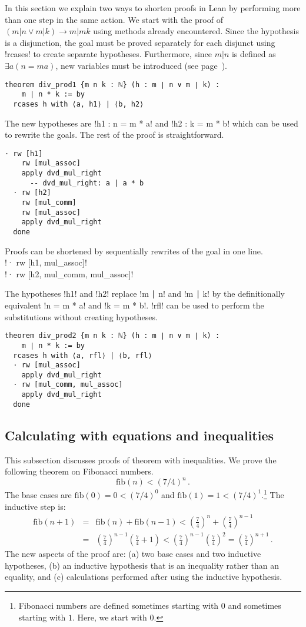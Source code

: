 In this section we explain two ways to shorten proofs in Lean by performing more than one step in the same action. We start with the proof of $(m|n \vee m|k) \rightarrow m | mk$ using methods already encountered. Since the hypothesis is a disjunction, the goal must be proved separately for each disjunct using !rcases! to create separate hypotheses. Furthermore, since $m|n$ is defined as $\exists a (n=ma)$, new variables must be introduced (see page~\pageref{p.rcases}).
\begin{Verbatim}
theorem div_prod1 {m n k : ℕ} (h : m ∣ n ∨ m ∣ k) :
    m ∣ n * k := by
  rcases h with ⟨a, h1⟩ | ⟨b, h2⟩
\end{Verbatim}
The new hypotheses are !h1 : n = m * a! and !h2 : k = m * b! which can be used to rewrite the goals. The rest of the proof is straightforward.
\begin{Verbatim}[firstnumber=last]
  · rw [h1]
    rw [mul_assoc]
    apply dvd_mul_right
      -- dvd_mul_right: a | a * b
  · rw [h2]
    rw [mul_comm]
    rw [mul_assoc]
    apply dvd_mul_right
  done
\end{Verbatim}

Proofs can be shortened by sequentially rewrites of the goal in one line.\\
\indnt{}!· rw [h1, mul_assoc]!\\
\indnt{}!· rw [h2, mul_comm, mul_assoc]!

The hypotheses !h1! and !h2! replace !m ∣ n! and !m ∣ k! by the definitionally equivalent !n = m * a! and !k = m * b!. !rfl! can be used to perform the substitutions without creating hypotheses.
\begin{Verbatim}
theorem div_prod2 {m n k : ℕ} (h : m ∣ n ∨ m ∣ k) :
    m ∣ n * k := by
  rcases h with ⟨a, rfl⟩ | ⟨b, rfl⟩
  · rw [mul_assoc]
    apply dvd_mul_right
  · rw [mul_comm, mul_assoc]
    apply dvd_mul_right
  done
\end{Verbatim}

\subsection{Calculating with equations and inequalities}

This subsection discusses proofs of theorem with inequalities. We prove the following theorem on Fibonacci numbers.
\[
\textrm{fib}(n) < (7/4)^n\,.
\]
The base cases are $\textrm{fib}(0) = 0 < (7/4)^0$ and $\textrm{fib}(1) = 1 < (7/4)^1$.\footnote{Fibonacci numbers are defined sometimes starting with $0$ and sometimes starting with $1$. Here, we start with $0$.} The inductive step is:
\begin{eqnarray*}
\textrm{fib}(n+1)&=&\textrm{fib}(n)+\textrm{fib}(n-1)<\left(\frac{7}{4}\right)^n + \left(\frac{7}{4}\right)^{n-1}\\
&=&\left(\frac{7}{4}\right)^{n-1}\left(\frac{7}{4}+1\right)<\left(\frac{7}{4}\right)^{n-1}\left(\frac{7}{4}\right)^2=\left(\frac{7}{4}\right)^{n+1}\,.
\end{eqnarray*}
The new aspects of the proof are: (a) two base cases and two inductive hypotheses, (b) an inductive hypothesis that is an inequality rather than an equality, and (c) calculations performed after using the inductive hypothesis.

